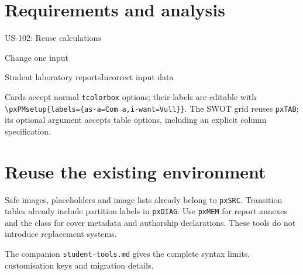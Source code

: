 \documentclass[a4paper]{article}
\begin{document}
\section{Requirements and analysis}
\begin{pxUserStory}{US-102: Reuse calculations}
\end{pxUserStory}
\begin{pxScenario}{Change one input}
\end{pxScenario}
  {Student laboratory reports}{Incorrect input data}

Cards accept normal \texttt{tcolorbox} options; their labels are editable
with \verb|\pxPMsetup{labels={as-a=Com a,i-want=Vull}}|.
The SWOT grid reuses \texttt{pxTAB}; its optional argument accepts table
options, including an explicit column specification.

\section{Reuse the existing environment}
Safe images, placeholders and image lists already belong to \texttt{pxSRC}.
Transition tables already include partition labels in \texttt{pxDIAG}.
Use \texttt{pxMEM} for report annexes and the class for cover metadata and
authorship declarations. These tools do not introduce replacement systems.

The companion \texttt{student-tools.md} gives the complete syntax limits,
customisation keys and migration details.
\end{document}
